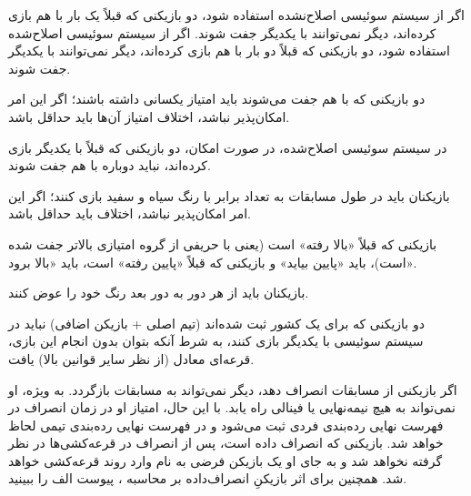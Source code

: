 \begin{bandha}
  \item[الف)] اگر از سیستم سوئیسی اصلاح‌نشده استفاده شود، دو بازیکنی که قبلاً یک بار با هم بازی کرده‌اند، دیگر نمی‌توانند با یکدیگر جفت شوند. اگر از سیستم سوئیسی اصلاح‌شده استفاده شود، دو بازیکنی که قبلاً دو بار با هم بازی کرده‌اند، دیگر نمی‌توانند با یکدیگر جفت شوند.
  \item[ب)] دو بازیکنی که با هم جفت می‌شوند باید امتیاز یکسانی داشته باشند؛ اگر این امر امکان‌پذیر نباشد، اختلاف امتیاز آن‌ها باید حداقل باشد.
  \item[ج)] در سیستم سوئیسی اصلاح‌شده، در صورت امکان، دو بازیکنی که قبلاً با یکدیگر بازی کرده‌اند، نباید دوباره با هم جفت شوند.
  \item[د)] بازیکنان باید در طول مسابقات به تعداد برابر با رنگ سیاه و سفید بازی کنند؛ اگر این امر امکان‌پذیر نباشد، اختلاف باید حداقل باشد.
  \item[هـ)] بازیکنی که قبلاً «بالا رفته» است (یعنی با حریفی از گروه امتیازی بالاتر جفت شده است)، باید «پایین بیاید» و بازیکنی که قبلاً «پایین رفته» است، باید «بالا برود».
  \item[و)] بازیکنان باید از هر دور به دور بعد رنگ خود را عوض کنند.
  \item[ز)] دو بازیکنی که برای یک کشور ثبت شده‌اند (تیم اصلی + بازیکن اضافی) نباید در سیستم سوئیسی با یکدیگر بازی کنند، به شرط آنکه بتوان بدون انجام این بازی، قرعه‌ای معادل (از نظر سایر قوانین بالا) یافت.
\end{bandha}


اگر بازیکنی از مسابقات انصراف دهد، دیگر نمی‌تواند به مسابقات بازگردد. به ویژه، او نمی‌تواند به هیچ نیمه‌نهایی یا فینالی راه یابد. با این حال، امتیاز او در زمان انصراف در فهرست نهایی رده‌بندی فردی ثبت می‌شود و در فهرست نهایی رده‌بندی تیمی لحاظ خواهد شد. بازیکنی که انصراف داده است، پس از انصراف در قرعه‌کشی‌ها در نظر گرفته نخواهد شد و به جای او یک بازیکن فرضی به نام  وارد روند قرعه‌کشی خواهد شد. همچنین برای اثر بازیکنِ انصراف‌داده بر محاسبه ، پیوست الف را ببینید.
